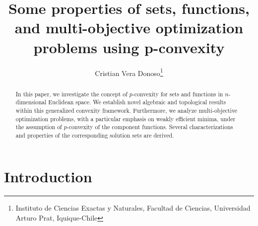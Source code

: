 \documentclass[10pt]{article}
\begin{document}
\title{Some properties of sets, functions, and multi-objective optimization problems using p-convexity}

%
\author{Cristian Vera Donoso\footnote{Instituto de Ciencias Exactas y Naturales, Facultad de
Ciencias, Universidad Arturo
Prat, Iquique-Chile}}
\maketitle


\begin{abstract}
In this paper, we investigate the concept of $p$-convexity for sets and functions in
$n$-dimensional Euclidean space. We establish novel algebraic and topological results
within this generalized convexity framework. Furthermore, we analyze multi-objective
optimization problems, with a particular emphasis on weakly efficient minima, under
the assumption of $p$-convexity of the component functions. Several characterizations
and properties of the corresponding solution sets are derived.
\medskip



\end{abstract}
\theoremstyle{plain}%
\newtheorem{theorem}{Theorem}[section]
\newtheorem{lemma}[theorem]{Lemma}
\newtheorem{corollary}[theorem]{Corollary}
\newtheorem{proposition}[theorem]{Proposition}

\theoremstyle{definition}
\newtheorem{definition}[theorem]{Definition}
\newtheorem{example}[theorem]{Example}

\theoremstyle{remark}
\newtheorem{remark}{Remark}
\newtheorem{notation}{Notation}
\newcommand{\R}{\mathbb{R}}
\newcommand{\N}{\mathbb{N}}


\section{Introduction}
\end{document}
